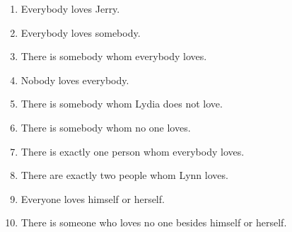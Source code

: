 \documentclass{article}
\begin{document}
        \begin{enumerate}
            \item Everybody loves Jerry.
            \item Everybody loves somebody.
            \item There is somebody whom everybody loves.
            \item Nobody loves everybody.
            \item There is somebody whom Lydia does not love.
            \item There is somebody whom no one loves.
            \item There is exactly one person whom everybody loves.
            \item There are exactly two people whom Lynn loves.
            \item Everyone loves himself or herself.
            \item There is someone who loves no one besides himself or herself.
        \end{enumerate}
\end{document}
